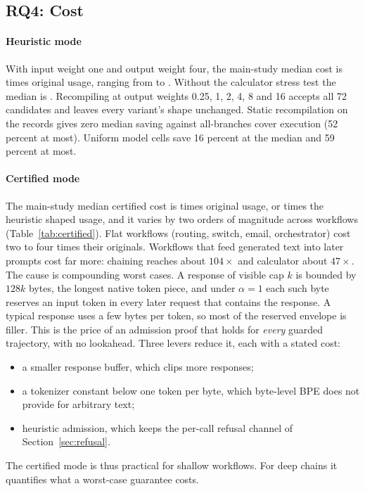 \subsection{RQ4: Cost}\label{sec:costs}

\paragraph{Heuristic mode}
With input weight one and output weight four, the main-study median cost is
\rThreeMedianCost{} times original usage, ranging from \roundTwoMin{} to
\roundTwoMax{}. Without the calculator stress test the median is
\rThreeMedianCostNoCalc{}. Recompiling at output weights 0.25, 1, 2, 4, 8 and 16
accepts all 72 candidates and leaves every variant's shape unchanged. Static
recompilation on the records gives zero median saving against all-branches cover
execution (52 percent at most). Uniform model cells save 16 percent at the median
and 59 percent at most.

\paragraph{Certified mode}
The main-study median certified cost is \rThreeCertMedianCost{} times original
usage, or \rThreeCertOverHeuristic{} times the heuristic shaped usage, and it
varies by two orders of magnitude across workflows (Table~\ref{tab:certified}).
Flat workflows (routing, switch, email, orchestrator) cost two to four times their
originals. Workflows that feed generated text into later prompts cost far more:
chaining reaches about $104\times$ and calculator about $47\times$. The cause is
compounding worst cases. A response of visible cap $k$ is bounded by $128k$ bytes,
the longest native token piece, and under $\alpha=1$ each such byte reserves an
input token in every later request that contains the response. A typical
response uses a few bytes per token, so most of the reserved envelope is filler.
This is the price of an admission proof that holds for \emph{every} guarded
trajectory, with no lookahead. Three levers reduce it, each with a stated cost:
\begin{itemize}
\item a smaller response buffer, which clips more responses;
\item a tokenizer constant below one token per byte, which byte-level BPE does not
provide for arbitrary text;
\item heuristic admission, which keeps the per-call refusal channel of
Section~\ref{sec:refusal}.
\end{itemize}
The certified mode is thus practical for shallow workflows. For deep chains it
quantifies what a worst-case guarantee costs.

